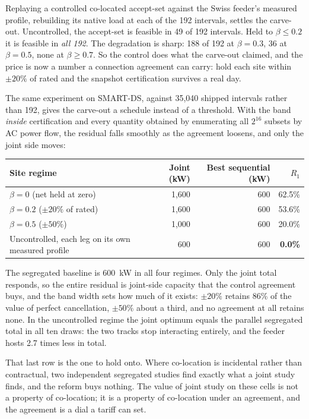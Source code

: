 \documentclass[review,authoryear,12pt]{elsarticle}
\begin{document}
Replaying a controlled co-located accept-set against the Swiss feeder's
measured profile, rebuilding its native load at each of the 192 intervals,
settles the carve-out. Uncontrolled, the accept-set is feasible in 49 of 192
intervals. Held to $\beta \le 0.2$ it is feasible in \emph{all 192}. The
degradation is sharp: 188 of 192 at $\beta=0.3$, 36 at $\beta=0.5$, none at
$\beta \ge 0.7$. So the control does what the carve-out claimed, and the price
is now a number a connection agreement can carry: hold each site within
$\pm20\%$ of rated and the snapshot certification survives a real day.

The same experiment on SMART-DS, against 35{,}040 shipped intervals rather than
192, gives the carve-out a schedule instead of a threshold. With the band
\emph{inside} certification and every quantity obtained by enumerating all
$2^{16}$ subsets by AC power flow, the residual falls smoothly as the agreement
loosens, and only the joint side moves:

\begin{center}
\small
\begin{tabular}{@{}lrrr@{}}
\toprule
Site regime & Joint (kW) & Best sequential (kW) & $R_{1}$ \\
\midrule
$\beta = 0$ (net held at zero) & 1{,}600 & 600 & 62.5\% \\
$\beta = 0.2$ ($\pm20\%$ of rated) & 1{,}600 & 600 & 53.6\% \\
$\beta = 0.5$ ($\pm50\%$) & 1{,}000 & 600 & 20.0\% \\
Uncontrolled, each leg on its own measured profile & 600 & 600 & \textbf{0.0\%} \\
\bottomrule
\end{tabular}
\end{center}

The segregated baseline is 600~kW in all four regimes. Only the joint total
responds, so the entire residual is joint-side capacity that the control
agreement buys, and the band width sets how much of it exists: $\pm20\%$
retains 86\% of the value of perfect cancellation, $\pm50\%$ about a third, and
no agreement at all retains none. In the uncontrolled regime the joint optimum
equals the parallel segregated total in all ten draws: the two tracks stop
interacting entirely, and the feeder hosts 2.7 times less in total.

That last row is the one to hold onto. Where co-location is incidental rather
than contractual, two independent segregated studies find exactly what a joint
study finds, and the reform buys nothing. The value of joint study on these
cells is not a property of co-location; it is a property of co-location under
an agreement, and the agreement is a dial a tariff can set.
\end{document}
